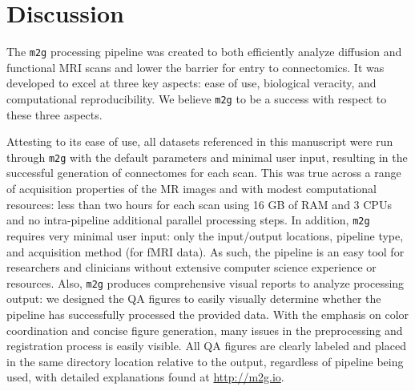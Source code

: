 
\section{Discussion}
The \texttt{m2g} processing pipeline was created to both efficiently analyze diffusion and functional MRI scans and lower the barrier for entry to connectomics. It was developed to excel at three key aspects: ease of use, biological veracity, and computational reproducibility. We believe \texttt{m2g} to be a success with respect to these three aspects.

Attesting to its ease of use, all datasets referenced in this manuscript were run through \texttt{m2g} with the default parameters and minimal user input, resulting in the successful generation of connectomes for each scan. This was true across a range of acquisition properties of the MR images and with modest computational resources: less than two hours for each scan using 16 GB of RAM and 3 CPUs and no intra-pipeline additional parallel processing steps. In addition, \texttt{m2g} requires very minimal user input: only the input/output locations, pipeline type, and acquisition method (for fMRI data).  As such, the pipeline is an easy tool for researchers and clinicians without extensive computer science experience or resources. Also, \texttt{m2g} produces comprehensive visual reports to analyze processing output: we designed the QA figures to easily visually determine whether the pipeline has successfully processed the provided data. With the emphasis on color coordination and concise figure generation, many issues in the preprocessing and registration process is easily visible. All QA figures are clearly labeled and placed in the same directory location relative to the output, regardless of pipeline being used, with detailed explanations found at \url{http://m2g.io}.

